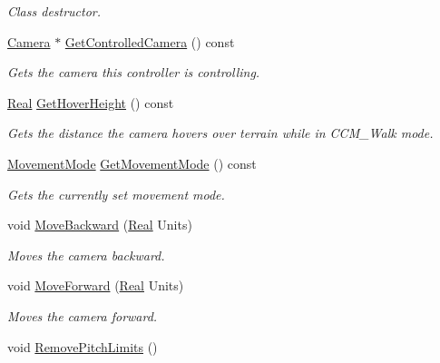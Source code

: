 \begin{DoxyCompactItemize}
\begin{DoxyCompactList}\small\item\em Class destructor. \item\end{DoxyCompactList}\item 
\hyperlink{classMezzanine_1_1Camera}{Camera} $\ast$ \hyperlink{classMezzanine_1_1CameraController_ae1029438ae1587099439de7ba6bb1df8}{GetControlledCamera} () const 
\begin{DoxyCompactList}\small\item\em Gets the camera this controller is controlling. \item\end{DoxyCompactList}\item 
\hyperlink{namespaceMezzanine_a726731b1a7df72bf3583e4a97282c6f6}{Real} \hyperlink{classMezzanine_1_1CameraController_a1973ffb9895ec8ab6d856ed975eb00ad}{GetHoverHeight} () const 
\begin{DoxyCompactList}\small\item\em Gets the distance the camera hovers over terrain while in CCM\_\-Walk mode. \item\end{DoxyCompactList}\item 
\hyperlink{classMezzanine_1_1CameraController_a2e4a40630fb6c845b8073151dc36c286}{MovementMode} \hyperlink{classMezzanine_1_1CameraController_a41981a1326cf06020c71f17674f82676}{GetMovementMode} () const 
\begin{DoxyCompactList}\small\item\em Gets the currently set movement mode. \item\end{DoxyCompactList}\item 
void \hyperlink{classMezzanine_1_1CameraController_a305107ca4e77609ecaa54b387db42acd}{MoveBackward} (\hyperlink{namespaceMezzanine_a726731b1a7df72bf3583e4a97282c6f6}{Real} Units)
\begin{DoxyCompactList}\small\item\em Moves the camera backward. \item\end{DoxyCompactList}\item 
void \hyperlink{classMezzanine_1_1CameraController_a6d57bd3d51d3329d0c33be37df609a10}{MoveForward} (\hyperlink{namespaceMezzanine_a726731b1a7df72bf3583e4a97282c6f6}{Real} Units)
\begin{DoxyCompactList}\small\item\em Moves the camera forward. \item\end{DoxyCompactList}\item 
\hypertarget{classMezzanine_1_1CameraController_a04b2acb69f1085ca197ce8f7e19e17d5}{
void \hyperlink{classMezzanine_1_1CameraController_a04b2acb69f1085ca197ce8f7e19e17d5}{RemovePitchLimits} ()}
\label{classMezzanine_1_1CameraController_a04b2acb69f1085ca197ce8f7e19e17d5}


\end{DoxyCompactItemize}
